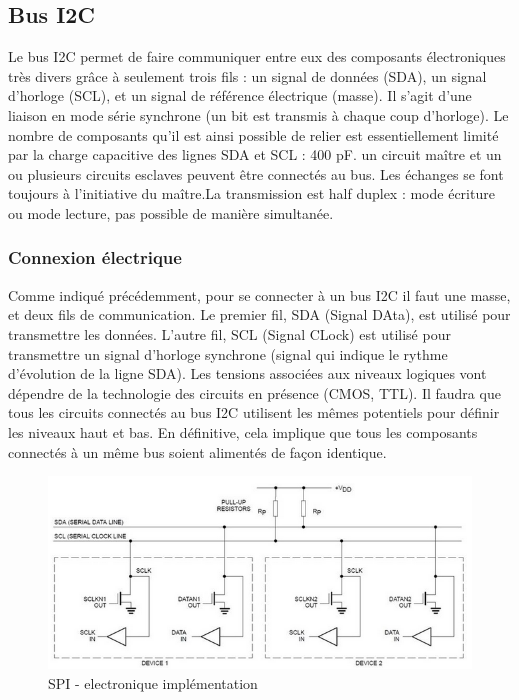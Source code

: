 \documentclass[french,a4paper,12pt]{report}
\begin{document}
 
 			\subsection{Bus I2C}
 			
 			Le bus I2C permet de faire communiquer entre eux des composants électroniques très divers grâce à seulement trois fils : un signal de données (SDA), un signal d'horloge (SCL), et un signal de référence électrique (masse).
Il s'agit d'une liaison en mode série synchrone (un bit est transmis à chaque coup d’horloge). Le nombre de composants qu'il est ainsi possible de relier est essentiellement limité par la charge capacitive des lignes SDA et SCL : 400 pF.
un circuit maître et un ou plusieurs circuits esclaves peuvent être connectés au bus. Les échanges se font toujours à l’initiative du maître.La transmission est half duplex : mode écriture ou mode lecture, pas possible de manière simultanée.
 
  		\subsubsection{Connexion électrique}
  		
  		Comme indiqué précédemment, pour se connecter à un bus I2C il faut une masse, et deux fils de communication. Le premier fil, SDA (Signal DAta), est utilisé pour transmettre les données. L'autre fil, SCL (Signal CLock) est utilisé pour transmettre un signal d'horloge synchrone (signal qui indique le rythme d'évolution de la ligne SDA). Les tensions associées aux niveaux logiques vont dépendre de la technologie des circuits en présence (CMOS, TTL). Il faudra que tous les circuits connectés au bus I2C utilisent les mêmes potentiels pour définir les niveaux haut et bas. En définitive, cela implique que tous les composants connectés à un même bus soient alimentés de façon identique.
  		
  \begin{figure}[!ht]
    \center
  	\includegraphics[width=12cm]{SPI5.png}
    \caption{SPI - electronique implémentation}
	\end{figure}
 
\end{document}
